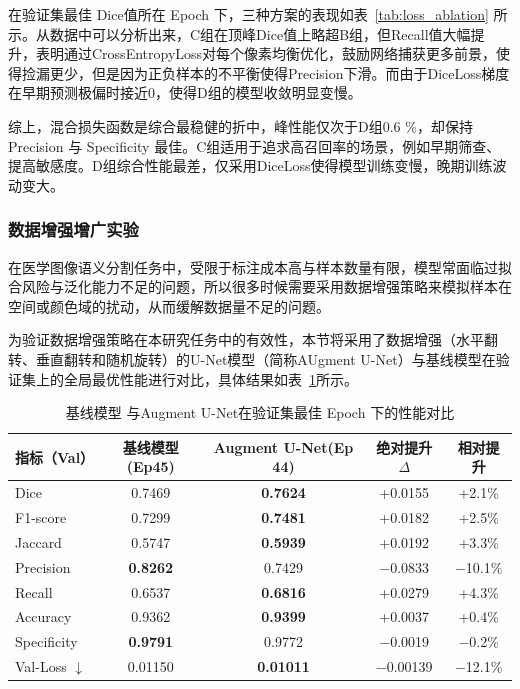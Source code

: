 在验证集最佳 Dice值所在 Epoch 下，三种方案的表现如表~\ref{tab:loss_ablation} 所示。从数据中可以分析出来，C组在顶峰Dice值上略超B组，但Recall值大幅提升，表明通过CrossEntropyLoss对每个像素均衡优化，鼓励网络捕获更多前景，使得捡漏更少，但是因为正负样本的不平衡使得Precision下滑。而由于DiceLoss梯度在早期预测极偏时接近0，使得D组的模型收敛明显变慢。

综上，混合损失函数是综合最稳健的折中，峰性能仅次于D组0.6 \%，却保持 Precision 与 Specificity 最佳。C组适用于追求高召回率的场景，例如早期筛查、提高敏感度。D组综合性能最差，仅采用DiceLoss使得模型训练变慢，晚期训练波动变大。

\subsubsection{数据增强增广实验}

在医学图像语义分割任务中，受限于标注成本高与样本数量有限，模型常面临过拟合风险与泛化能力不足的问题，所以很多时候需要采用数据增强策略来模拟样本在空间或颜色域的扰动，从而缓解数据量不足的问题。

为验证数据增强策略在本研究任务中的有效性，本节将采用了数据增强（水平翻转、垂直翻转和随机旋转）的U-Net模型（简称AUgment U-Net）与基线模型在验证集上的全局最优性能进行对比，具体结果如表~\ref{tab:augment_best}所示。

\begin{table}[htbp]
    \centering
    \caption{基线模型 与Augment U-Net在验证集最佳 Epoch 下的性能对比}
    \label{tab:augment_best}
    \begin{tabular}{lcccc}
        \toprule
        指标（Val） & 基线模型(Ep45) & Augment U-Net(Ep 44) & 绝对提升 $\Delta$ & 相对提升 \\
        \midrule
        Dice        & 0.7469 & \textbf{0.7624} & +0.0155 & +2.1\% \\
        F1-score    & 0.7299 & \textbf{0.7481} & +0.0182 & +2.5\% \\
        Jaccard     & 0.5747 & \textbf{0.5939} & +0.0192 & +3.3\% \\
        Precision   & \textbf{0.8262} & 0.7429 & $-$0.0833 & $-$10.1\% \\
        Recall      & 0.6537 & \textbf{0.6816} & +0.0279 & +4.3\% \\
        Accuracy    & 0.9362 & \textbf{0.9399} & +0.0037 & +0.4\% \\
        Specificity & \textbf{0.9791} & 0.9772 & $-$0.0019 & $-$0.2\% \\
        Val-Loss $\downarrow$ & 0.01150 & \textbf{0.01011} & $-$0.00139 & $-$12.1\% \\
        \bottomrule
    \end{tabular}
\end{table}

